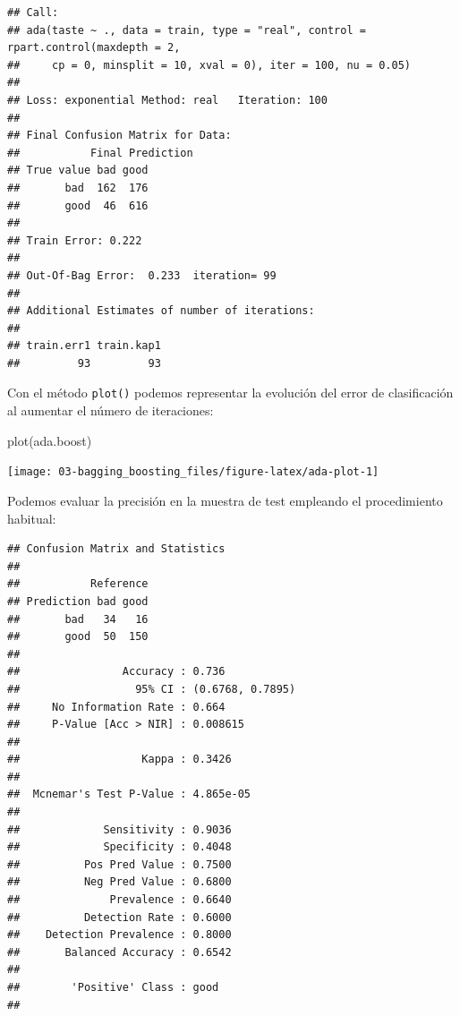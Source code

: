 \documentclass[
  spanish,
]{book}
\newenvironment{Shaded}{\begin{snugshade}}{\end{snugshade}}
\newcommand{\AttributeTok}[1]{\textcolor[rgb]{0.77,0.63,0.00}{#1}}
\newcommand{\FunctionTok}[1]{\textcolor[rgb]{0.00,0.00,0.00}{#1}}
\newcommand{\NormalTok}[1]{#1}
\newcommand{\OtherTok}[1]{\textcolor[rgb]{0.56,0.35,0.01}{#1}}
\newcommand{\SpecialCharTok}[1]{\textcolor[rgb]{0.00,0.00,0.00}{#1}}
\newcommand{\StringTok}[1]{\textcolor[rgb]{0.31,0.60,0.02}{#1}}
\theoremstyle{break}
\theoremstyle{definition}
\theoremstyle{definition}
\theoremstyle{definition}
\theoremstyle{definition}
\theoremstyle{remark}
\begin{document}
\begin{verbatim}
## Call:
## ada(taste ~ ., data = train, type = "real", control = rpart.control(maxdepth = 2, 
##     cp = 0, minsplit = 10, xval = 0), iter = 100, nu = 0.05)
## 
## Loss: exponential Method: real   Iteration: 100 
## 
## Final Confusion Matrix for Data:
##           Final Prediction
## True value bad good
##       bad  162  176
##       good  46  616
## 
## Train Error: 0.222 
## 
## Out-Of-Bag Error:  0.233  iteration= 99 
## 
## Additional Estimates of number of iterations:
## 
## train.err1 train.kap1 
##         93         93
\end{verbatim}

Con el método \texttt{plot()} podemos representar la evolución del error de clasificación al aumentar el número de iteraciones:

\begin{Shaded}
\begin{Highlighting}[]
\FunctionTok{plot}\NormalTok{(ada.boost)}
\end{Highlighting}
\end{Shaded}

\begin{center}\texttt{[image: 03-bagging\_boosting\_files/figure-latex/ada-plot-1]} \end{center}

Podemos evaluar la precisión en la muestra de test empleando el procedimiento habitual:

\begin{Shaded}
\end{Shaded}

\begin{verbatim}
## Confusion Matrix and Statistics
## 
##           Reference
## Prediction bad good
##       bad   34   16
##       good  50  150
##                                           
##                Accuracy : 0.736           
##                  95% CI : (0.6768, 0.7895)
##     No Information Rate : 0.664           
##     P-Value [Acc > NIR] : 0.008615        
##                                           
##                   Kappa : 0.3426          
##                                           
##  Mcnemar's Test P-Value : 4.865e-05       
##                                           
##             Sensitivity : 0.9036          
##             Specificity : 0.4048          
##          Pos Pred Value : 0.7500          
##          Neg Pred Value : 0.6800          
##              Prevalence : 0.6640          
##          Detection Rate : 0.6000          
##    Detection Prevalence : 0.8000          
##       Balanced Accuracy : 0.6542          
##                                           
##        'Positive' Class : good            
## 
\end{verbatim}
\end{document}
